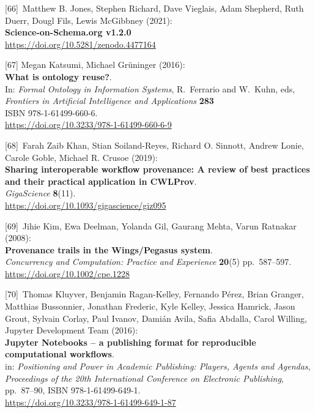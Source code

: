 {[}66{]}~Matthew B. Jones, Stephen Richard, Dave Vieglais, Adam
Shepherd, Ruth Duerr, Dougl Fils, Lewis McGibbney (2021):\\
\textbf{Science-on-Schema.org v1.2.0}\\
\url{https://doi.org/10.5281/zenodo.4477164}

{[}67{]} Megan Katsumi, Michael Grüninger (2016):\\
\textbf{What is ontology reuse?}.\\
In: \emph{Formal Ontology in Information Systems}, R.~Ferrario and
W.~Kuhn, eds,\\
\emph{Frontiers in Artificial Intelligence and Applications}
\textbf{283}\\
ISBN 978-1-61499-660-6.\\
\url{https://doi.org/10.3233/978-1-61499-660-6-9}

{[}68{]}~Farah Zaib Khan, Stian Soiland-Reyes, Richard O. Sinnott,
Andrew Lonie, Carole Goble, Michael R. Crusoe (2019):\\
\textbf{Sharing interoperable workflow provenance: A review of best
practices and their practical application in CWLProv}.\\
\emph{GigaScience} \textbf{8}(11).\\
\url{https://doi.org/10.1093/gigascience/giz095}

{[}69{]}~Jihie Kim, Ewa Deelman, Yolanda Gil, Gaurang Mehta, Varun
Ratnakar (2008):\\
\textbf{Provenance trails in the Wings/Pegasus system}.\\
\emph{Concurrency and Computation: Practice and Experience}
\textbf{20}(5) pp.~587--597.\\
\url{https://doi.org/10.1002/cpe.1228}

{[}70{]}~Thomas Kluyver, Benjamin Ragan-Kelley, Fernando Pérez, Brian
Granger, Matthias Bussonnier, Jonathan Frederic, Kyle Kelley, Jessica
Hamrick, Jason Grout, Sylvain Corlay, Paul Ivanov, Damián Avila, Safia
Abdalla, Carol Willing, Jupyter Development Team (2016):\\
\textbf{Jupyter Notebooks -- a publishing format for reproducible
computational workflows}.\\
in: \emph{Positioning and Power in Academic Publishing: Players, Agents
and Agendas},\\
\emph{Proceedings of the 20th International Conference on Electronic
Publishing}, pp.~87--90, ISBN 978-1-61499-649-1.\\
\url{https://doi.org/10.3233/978-1-61499-649-1-87}

